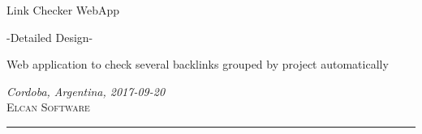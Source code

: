\documentclass[a4paper]{article}
\author{%
	Mario O. Villarroel \\
	Customer Care/System Design\\
	\texttt{movilla@elcansoftware.com}\vspace{20pt} \\
	Juan P. Aguilar\\
	System Development \\
	\texttt{aguilarjpb@elcansoftware.com}
}
\def\documentdate{Cordoba, Argentina, 2017-09-20}
\begin{document}
	\begin{titlepage}
		\noindent
		\titlefont Link Checker WebApp\par
		\vspace*{15pt}
		\subtitlefont -Detailed Design-
		\epigraph{Web application to check several backlinks grouped by project automatically}%
		{\textit{\documentdate}\\ \textsc{Elcan Software}}
		\null\vfill
		\vspace*{1cm}
		\noindent
		\hfill
		\begin{minipage}{0.50\linewidth}
		    \begin{flushright}
		        \printauthor
		    \end{flushright}
		\end{minipage}
		\begin{minipage}{0.02\linewidth}
		    \rule{1pt}{125pt}
		\end{minipage}
		\titlepagedecoration
	\end{titlepage}
	
	
\end{document}
